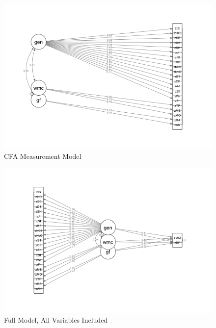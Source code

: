 \documentclass[]{book}
\begin{document}
\begin{figure}

{\centering \includegraphics[width=1\linewidth]{img/measurementModel} 

}

\caption{CFA Measurement Model}\label{fig:measurementmodel}
\end{figure}

\begin{figure}

{\centering \includegraphics[width=1\linewidth]{img/sem1} 

}

\caption{Full Model, All Variables Included}\label{fig:model1}
\end{figure}
\end{document}
